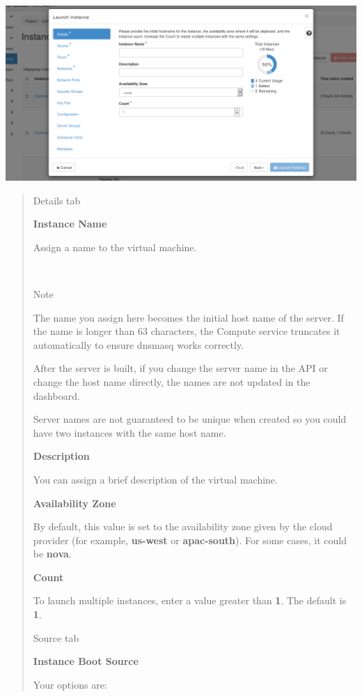\begin{center}
\includegraphics[scale=0.5]{img/tab-compute-instances-launch.png}
\end{center}


\begin{quote}
Details tab

\textbf{Instance Name}

Assign a name to the virtual machine.

~

Note

The name you assign here becomes the initial host name of the server. If
the name is longer than 63 characters, the Compute service truncates it
automatically to ensure dnsmasq works correctly.

After the server is built, if you change the server name in the API or
change the host name directly, the names are not updated in the
dashboard.

Server names are not guaranteed to be unique when created so you could
have two instances with the same host name.

\textbf{Description}

You can assign a brief description of the virtual machine.

\textbf{Availability Zone}

By default, this value is set to the availability zone given by the
cloud provider (for example, \textbf{us-west} or \textbf{apac-south}).
For some cases, it could be \textbf{nova}.

\textbf{Count}

To launch multiple instances, enter a value greater than \textbf{1}. The
default is \textbf{1}.

Source tab

\textbf{Instance Boot Source}

Your options are:


\end{quote}
